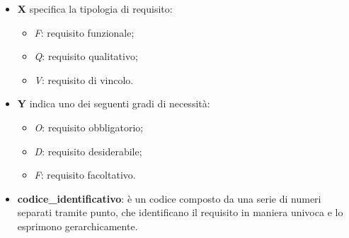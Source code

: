                 \begin{itemize}
                    \item \textbf{X} specifica la tipologia di requisito:
                        \begin{itemize}
                            \item \textit{F}: requisito funzionale;
                            \item \textit{Q}: requisito qualitativo;
                            \item \textit{V}: requisito di vincolo.
                        \end{itemize}
                    \item \textbf{Y} indica uno dei seguenti gradi di necessità:
                        \begin{itemize}
                            \item \textit{O}: requisito obbligatorio;
                            \item \textit{D}: requisito desiderabile;
                            \item \textit{F}: requisito facoltativo.
                        \end{itemize}
                    \item \textbf{codice\_identificativo}: è un codice composto da una serie di numeri separati tramite
                    punto, che identificano il requisito in maniera univoca e lo esprimono gerarchicamente.
                \end{itemize}
          
